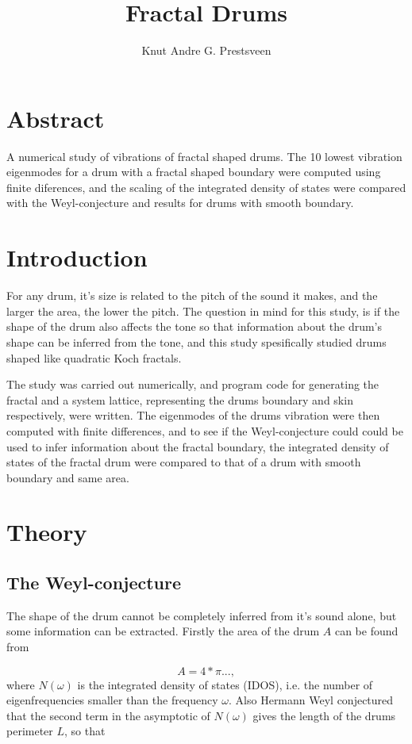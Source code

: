 \documentclass{article}
\title{Fractal Drums}
\author{Knut Andre G. Prestsveen}
\begin{document}
\maketitle




\section{Abstract}
A numerical study of vibrations of fractal shaped drums. The 10 lowest vibration eigenmodes for a drum with a   fractal shaped boundary were computed using finite diferences, and the scaling of the integrated density of states were compared with the Weyl-conjecture and results for drums with smooth boundary.

\section{Introduction}
For any drum, it's size is related to the pitch of the sound it makes, and the larger the area, the lower the pitch. The question in mind for this study, is if the shape of the drum also affects the tone so that information about the drum's shape can be inferred from the tone, and this study spesifically studied drums shaped like quadratic Koch fractals.

The study was carried out numerically, and program code for generating the fractal and a system lattice, representing the drums boundary and skin respectively, were written. The eigenmodes of the drums vibration were then computed with finite differences, and to see if the Weyl-conjecture could could be used to infer information about the fractal boundary, the integrated density of states of the fractal drum were compared to that of a drum with smooth boundary and same area.

\section{Theory}\label{theory}
\subsection{The Weyl-conjecture}
The shape of the drum cannot be completely inferred from it's sound alone, but some information can be extracted. Firstly the area of the drum $A$ can be found from

\begin{equation}
    \label{area}
    A = 4*\pi ...,
\end{equation}
where $N(\omega)$ is the integrated density of states (IDOS), i.e. the number of eigenfrequencies smaller than the frequency $\omega$. Also Hermann Weyl conjectured that the second term in the asymptotic of $N(\omega)$ gives the length of the drums perimeter $L$, so that
\end{document}
